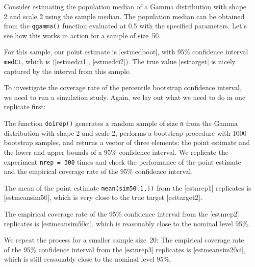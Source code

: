 \begin{example}
Consider estimating the population median of a Gamma distribution with
shape 2 and scale 2 using the sample median. The population median can be
obtained from the \lstinline{qgamma()} function evaluated at 0.5 with the
specified parameters. Let's see how this works in action for a sample of
size~50.

For this sample, our point estimate is
[estmedboot], with 95\% confidence
interval \lstinline{medCI}, which is
$($[estmedci1],
[estmedci2]$)$.
The true value [esttarget] is nicely captured
by the interval from this sample.


To investigate the coverage rate of the percentile bootstrap confidence
interval, we need to run a simulation study. Again, we lay out what we
need to do in one replicate first:


The function \lstinline{do1rep()} generates a random sample of size
\lstinline{n} from the Gamma distribution with shape 2 and scale 2,
performs a bootstrap procedure with 1000 bootstrap samples, and returns
a vector of three elements: the point estimate and
the lower and upper bounds of a 95\% confidence interval. We replicate the
experiment \lstinline{nrep = 300} times and check the performance of the point
estimate and the empirical coverage rate of the 95\% confidence interval.


The mean of the point estimate \lstinline{mean(sim50[1,])} from the
[estnrep1] replicates is
[estmeansim50], which is very close
to the true target [esttarget2].


The empirical coverage rate of the 95\% confidence interval from the
[estnrep2] replicates is
%
[estmeansim50ci],
which is reasonably close to the nominal level 95\%.


We repeat the process for a smaller sample size~20:
The empirical coverage rate of the 95\% confidence interval from the
[estnrep3]  replicates is
%
[estmeansim20ci],
which is still reasonably close to the nominal level 95\%.


\end{example}
